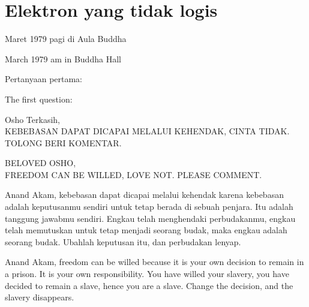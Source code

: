 \chapter{Elektron yang tidak logis}

 Maret 1979 pagi di Aula Buddha

 March 1979 am in Buddha Hall

\bahasa
Pertanyaan pertama:

\english
The first question:

\bahasa
Osho Terkasih,\\
KEBEBASAN DAPAT DICAPAI MELALUI KEHENDAK, CINTA TIDAK. TOLONG BERI KOMENTAR.

\english
BELOVED OSHO,\\
FREEDOM CAN BE WILLED, LOVE NOT. PLEASE COMMENT.

\bahasa
Anand Akam, kebebasan dapat dicapai melalui kehendak karena kebebasan adalah keputusanmu sendiri untuk tetap berada di sebuah penjara. Itu adalah tanggung jawabmu sendiri. Engkau telah menghendaki perbudakanmu, engkau telah memutuskan untuk tetap menjadi seorang budak, maka engkau adalah seorang budak. Ubahlah keputusan itu, dan perbudakan lenyap.

\english
Anand Akam, freedom can be willed because it is your own decision to remain in a
prison. It is your own responsibility. You have willed your slavery, you have decided to remain a slave, hence you are a slave. Change the decision, and the slavery disappears.
